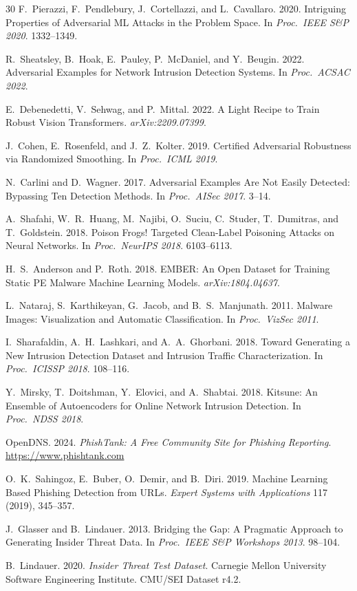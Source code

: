 \documentclass[sigconf,nonacm]{acmart}
\begin{document}
\begin{thebibliography}{30}
F.~Pierazzi, F.~Pendlebury, J.~Cortellazzi, and L.~Cavallaro. 2020. Intriguing
Properties of Adversarial ML Attacks in the Problem Space.
In \textit{Proc.\ IEEE S\&P 2020}. 1332--1349.

R.~Sheatsley, B.~Hoak, E.~Pauley, P.~McDaniel, and Y.~Beugin. 2022. Adversarial
Examples for Network Intrusion Detection Systems. In \textit{Proc.\ ACSAC 2022}.

E.~Debenedetti, V.~Sehwag, and P.~Mittal. 2022. A Light Recipe to Train
Robust Vision Transformers. \textit{arXiv:2209.07399}.

J.~Cohen, E.~Rosenfeld, and J.~Z.~Kolter. 2019. Certified Adversarial
Robustness via Randomized Smoothing. In \textit{Proc.\ ICML 2019}.

N.~Carlini and D.~Wagner. 2017. Adversarial Examples Are Not Easily Detected:
Bypassing Ten Detection Methods. In \textit{Proc.\ AISec 2017}. 3--14.

A.~Shafahi, W.~R.~Huang, M.~Najibi, O.~Suciu, C.~Studer, T.~Dumitras, and
T.~Goldstein. 2018. Poison Frogs! Targeted Clean-Label Poisoning Attacks on
Neural Networks. In \textit{Proc.\ NeurIPS 2018}. 6103--6113.

H.~S.~Anderson and P.~Roth. 2018. EMBER: An Open Dataset for Training Static
PE Malware Machine Learning Models. \textit{arXiv:1804.04637}.

L.~Nataraj, S.~Karthikeyan, G.~Jacob, and B.~S.~Manjunath. 2011. Malware
Images: Visualization and Automatic Classification. In
\textit{Proc.\ VizSec 2011}.

I.~Sharafaldin, A.~H.~Lashkari, and A.~A.~Ghorbani. 2018. Toward Generating a
New Intrusion Detection Dataset and Intrusion Traffic Characterization.
In \textit{Proc.\ ICISSP 2018}. 108--116.

Y.~Mirsky, T.~Doitshman, Y.~Elovici, and A.~Shabtai. 2018. Kitsune: An Ensemble
of Autoencoders for Online Network Intrusion Detection. In
\textit{Proc.\ NDSS 2018}.

OpenDNS. 2024. \textit{PhishTank: A Free Community Site for Phishing Reporting}.
\url{https://www.phishtank.com}

O.~K.~Sahingoz, E.~Buber, O.~Demir, and B.~Diri. 2019. Machine Learning Based
Phishing Detection from URLs. \textit{Expert Systems with Applications} 117
(2019), 345--357.

J.~Glasser and B.~Lindauer. 2013. Bridging the Gap: A Pragmatic Approach to
Generating Insider Threat Data. In \textit{Proc.\ IEEE S\&P Workshops 2013}.
98--104.

B.~Lindauer. 2020. \textit{Insider Threat Test Dataset}. Carnegie Mellon
University Software Engineering Institute. CMU/SEI Dataset r4.2.

\end{thebibliography}
\end{document}

